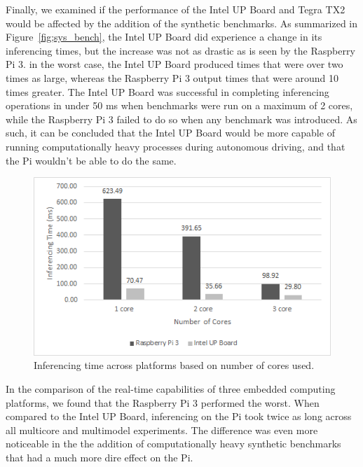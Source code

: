 Finally, we examined if the performance of the Intel UP Board and Tegra TX2 would be affected by the 
addition of the synthetic benchmarks. As summarized in Figure~\ref{fig;sys_bench}, the Intel UP Board 
did experience a change in its inferencing times, but the increase was not as drastic as is seen by 
the Raspberry Pi 3. in the worst case, the Intel UP Board produced times that were over two times as 
large, whereas the Raspberry Pi 3 output times that were around 10 times greater. The Intel UP Board 
was successful in completing inferencing operations in under 50 ms when benchmarks were run on a 
maximum of 2 cores, while the Raspberry Pi 3 failed to do so when any benchmark was introduced. As 
such, it can be concluded that the Intel UP Board would be more capable of running computationally 
heavy processes during autonomous driving, and that the Pi wouldn't be able to do the same.

\begin{figure}[h]
  \centering
  \includegraphics[width=.5\textwidth]{figs/system_benchmark}
  \caption{Inferencing time across platforms based on number of cores used.}
  \label{fig:sys_bench}
\end{figure} 

In the comparison of the real-time capabilities of three embedded computing platforms, we found that 
the Raspberry Pi 3 performed the worst. When compared to the Intel UP Board, inferencing on the Pi 
took twice as long across all multicore and multimodel experiments. The difference was even more 
noticeable in the the addition of computationally heavy synthetic benchmarks that had a much more 
dire effect on the Pi.